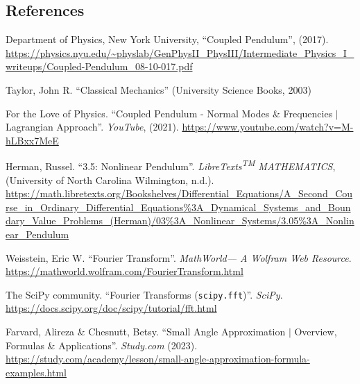 \documentclass[12pt]{article}
\begin{document}
\subsection*{References}
\begin{enumerate}[label={[\arabic*]}]
    \item \label{sec:1} Department of Physics, New York University, ``Coupled Pendulum'', (2017). \url{https://physics.nyu.edu/~physlab/GenPhysII_PhysIII/Intermediate_Physics_I_writeups/Coupled-Pendulum_08-10-017.pdf}
    \item \label{sec:2} Taylor, John R. ``Classical Mechanics'' (University Science Books, 2003)
    \item \label{sec:3} For the Love of Physics. ``Coupled Pendulum - Normal Modes \& Frequencies $\vert$ Lagrangian Approach''. \textit{YouTube}, (2021). \url{https://www.youtube.com/watch?v=M-hLBxx7MeE}
    \item \label{sec:4} Herman, Russel. ``3.5: Nonlinear Pendulum''. \textit{LibreTexts\textsuperscript{TM} MATHEMATICS}, (University of North Carolina Wilmington, n.d.). \url{https://math.libretexts.org/Bookshelves/Differential_Equations/A_Second_Course_in_Ordinary_Differential_Equations%3A_Dynamical_Systems_and_Boundary_Value_Problems_(Herman)/03%3A_Nonlinear_Systems/3.05%3A_Nonlinear_Pendulum}
    \item \label{sec:5} Weisstein, Eric W. ``Fourier Transform''. \textit{MathWorld--- A Wolfram Web Resource}. \url{https://mathworld.wolfram.com/FourierTransform.html}
    \item \label{sec:6} The SciPy community. ``Fourier Transforms (\texttt{scipy.fft})''. \textit{SciPy}. \url{https://docs.scipy.org/doc/scipy/tutorial/fft.html}
    \item \label{sec:7} Farvard, Alireza \& Chesnutt, Betsy. ``Small Angle Approximation $\vert$ Overview, Formulas \& Applications''. \textit{Study.com} (2023). \url{https://study.com/academy/lesson/small-angle-approximation-formula-examples.html}
\end{enumerate}


\end{document}
